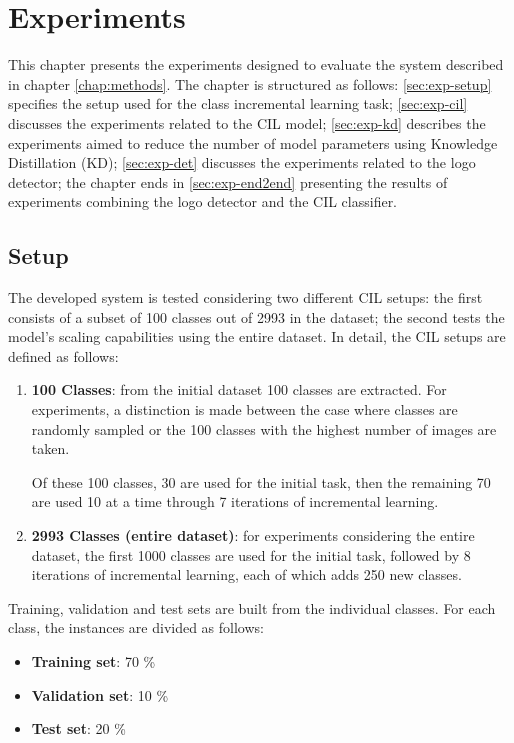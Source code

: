 \chapter{Experiments}
\label{chap:experiments}
This chapter presents the experiments designed to evaluate the system described in chapter \autoref{chap:methods}.
The chapter is structured as follows:
\autoref{sec:exp-setup} specifies the setup used for the class incremental learning task;
\autoref{sec:exp-cil} discusses the experiments related to the CIL model;
\autoref{sec:exp-kd} describes the experiments aimed to reduce the number of model parameters using Knowledge Distillation (KD);
\autoref{sec:exp-det} discusses the experiments related to the logo detector;
the chapter ends in \autoref{sec:exp-end2end} presenting the results of experiments combining the logo detector and the CIL classifier.

\section{Setup}
\label{sec:exp-setup}
The developed system is tested considering two different CIL setups: the first consists of a subset of 100 classes out of 2993 in the dataset; the second tests the model's scaling capabilities using the entire dataset.
In detail, the CIL setups are defined as follows:
\begin{enumerate}
    \item \textbf{100 Classes}: from the initial dataset 100 classes are extracted. 
    For experiments, a distinction is made between the case where classes are randomly sampled or the 100 classes with the highest number of images are taken.
    
    Of these 100 classes, 30 are used for the initial task, then the remaining 70 are used 10 at a time through 7 iterations of incremental learning.

    \item \textbf{2993 Classes (entire dataset)}: for experiments considering the entire dataset, the first 1000 classes are used for the initial task, followed by 8 iterations of incremental learning, each of which adds 250 new classes.
\end{enumerate}

Training, validation and test sets are built from the individual classes. For each class, the instances are divided as follows:
\begin{itemize}
    \item \textbf{Training set}: 70 \%
    \item \textbf{Validation set}: 10 \%
    \item \textbf{Test set}: 20 \%
\end{itemize}


